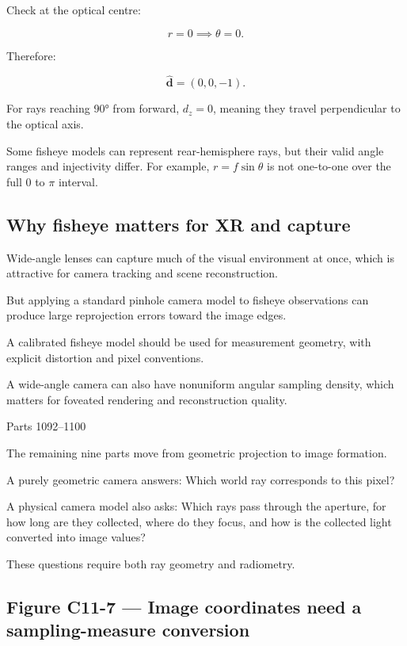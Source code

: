 Check at the optical centre:

\[ r=0\implies\theta=0. \]

Therefore:

\[ \hat{\mathbf d}=(0,0,-1). \]

For rays reaching 90° from forward, \(d_z=0\), meaning they travel perpendicular to the optical axis.

Some fisheye models can represent rear-hemisphere rays, but their valid angle ranges and injectivity differ. For example, \(r=f\sin\theta\) is not one-to-one over the full \(0\) to \(\pi\) interval.

\subsection{Why fisheye matters for XR and capture}\label{02-foundations-ii-ch035-why-fisheye-matters-for-xr-and-capture}

Wide-angle lenses can capture much of the visual environment at once, which is attractive for camera tracking and scene reconstruction.

But applying a standard pinhole camera model to fisheye observations can produce large reprojection errors toward the image edges.

A calibrated fisheye model should be used for measurement geometry, with explicit distortion and pixel conventions.

A wide-angle camera can also have nonuniform angular sampling density, which matters for foveated rendering and reconstruction quality.

Parts 1092--1100

The remaining nine parts move from geometric projection to image formation.

A purely geometric camera answers: Which world ray corresponds to this pixel?

A physical camera model also asks: Which rays pass through the aperture, for how long are they collected, where do they focus, and how is the collected light converted into image values?

These questions require both ray geometry and radiometry.

\subsection{Figure C11-7 --- Image coordinates need a sampling-measure conversion}\label{02-foundations-ii-ch035-figure-c11-7-image-coordinates-need-a-sampling-measure-conversion}

